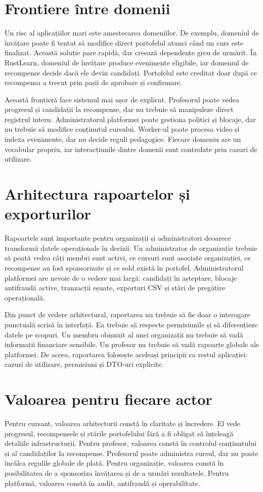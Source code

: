 \section{Frontiere între domenii}
Un risc al aplicațiilor mari este amestecarea domeniilor. De exemplu, domeniul de învățare poate fi tentat să modifice direct portofelul atunci când un curs este finalizat. Această soluție pare rapidă, dar creează dependențe greu de urmărit. În RustLearn, domeniul de învățare produce evenimente eligibile, iar domeniul de recompense decide dacă ele devin candidați. Portofelul este creditat doar după ce recompensa a trecut prin pașii de aprobare și confirmare.

Această frontieră face sistemul mai ușor de explicat. Profesorul poate vedea progresul și candidații la recompense, dar nu trebuie să manipuleze direct registrul intern. Administratorul platformei poate gestiona politici și blocaje, dar nu trebuie să modifice conținutul cursului. Worker-ul poate procesa video și indexa evenimente, dar nu decide reguli pedagogice. Fiecare domeniu are un vocabular propriu, iar interacțiunile dintre domenii sunt controlate prin cazuri de utilizare.

\section{Arhitectura rapoartelor și exporturilor}
Rapoartele sunt importante pentru organizații și administratori deoarece transformă datele operaționale în decizii. Un administrator de organizație trebuie să poată vedea câți membri sunt activi, ce cursuri sunt asociate organizației, ce recompense au fost sponsorizate și ce sold există în portofel. Administratorul platformei are nevoie de o vedere mai largă: candidați în așteptare, blocaje antifraudă active, tranzacții eșuate, exporturi CSV și stări de pregătire operațională.

Din punct de vedere arhitectural, raportarea nu trebuie să fie doar o interogare punctuală scrisă în interfață. Ea trebuie să respecte permisiunile și să diferențieze datele pe scopuri. Un membru obișnuit al unei organizații nu trebuie să vadă informații financiare sensibile. Un profesor nu trebuie să vadă rapoarte globale ale platformei. De aceea, raportarea folosește aceleași principii ca restul aplicației: cazuri de utilizare, permisiuni și DTO-uri explicite.

\section{Valoarea pentru fiecare actor}
Pentru cursant, valoarea arhitecturii constă în claritate și încredere. El vede progresul, recompensele și stările portofelului fără a fi obligat să înțeleagă detaliile infrastructurii. Pentru profesor, valoarea constă în controlul conținutului și al candidaților la recompense. Profesorul poate administra cursul, dar nu poate încălca regulile globale de plată. Pentru organizație, valoarea constă în posibilitatea de a sponsoriza învățarea și de a urmări rezultatele. Pentru platformă, valoarea constă în audit, antifraudă și operabilitate.

